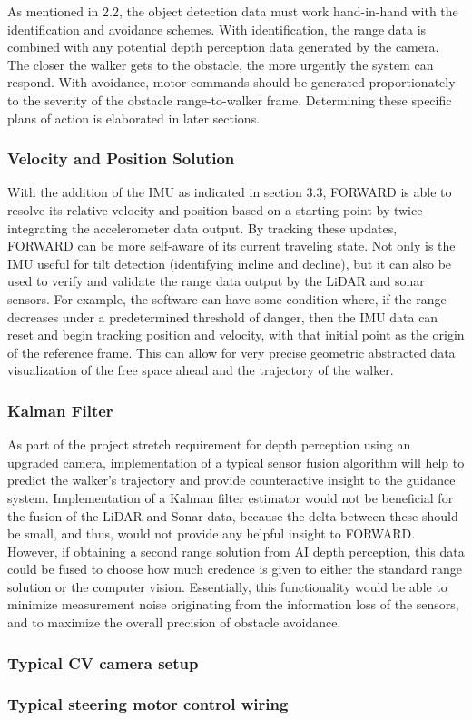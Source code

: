\noindent As mentioned in 2.2, the object detection data must work hand-in-hand with the identification and avoidance schemes. With identification, the range data is combined with any potential depth perception data generated by the camera. The closer the walker gets to the obstacle, the more urgently the system can respond. With avoidance, motor commands should be generated proportionately to the severity of the obstacle range-to-walker frame. Determining these specific plans of action is elaborated in later sections.\\

\subsubsection{Velocity and Position Solution}
\noindent With the addition of the IMU as indicated in section 3.3, FORWARD is able to resolve its relative velocity and position based on a starting point by twice integrating the accelerometer data output. By tracking these updates, FORWARD can be more self-aware of its current traveling state. Not only is the IMU useful for tilt detection (identifying incline and decline), but it can also be used to verify and validate the range data output by the LiDAR and sonar sensors. For example, the software can have some condition where, if the range decreases under a predetermined threshold of danger, then the IMU data can reset and begin tracking position and velocity, with that initial point as the origin of the reference frame. This can allow for very precise geometric abstracted data visualization of the free space ahead and the trajectory of the walker.\\

\subsubsection{Kalman Filter}
\noindent As part of the project stretch requirement for depth perception using an upgraded camera, implementation of a typical sensor fusion algorithm will help to predict the walker's trajectory and provide counteractive insight to the guidance system. Implementation of a Kalman filter estimator would not be beneficial for the fusion of the LiDAR and Sonar data, because the delta between these should be small, and thus, would not provide any helpful insight to FORWARD. However, if obtaining a second range solution from AI depth perception, this data could be fused to choose how much credence is given to either the standard range solution or the computer vision. Essentially, this functionality would be able to minimize measurement noise originating from the information loss of the sensors, and to maximize the overall precision of obstacle avoidance.\\

\subsubsection{Typical CV camera setup}

\subsubsection{Typical steering motor control wiring}
